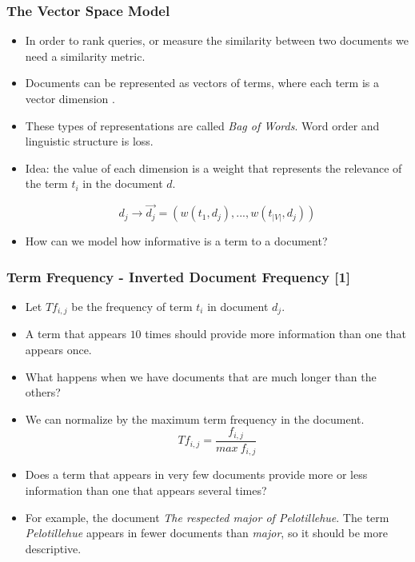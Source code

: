 \documentclass[handout]{beamer}
\begin{document}
\begin{frame}\frametitle{The Vector Space Model}
\footnotesize{
\begin{itemize}
 \item In order to rank queries, or measure the similarity between two documents we need a similarity metric.
 \item Documents can be represented as vectors of terms, where each term is a vector dimension \cite{salton1975vector}. 
 \item These types of representations are called \emph{Bag of Words}. Word order and linguistic structure is loss. 
 \item Idea: the value of each dimension is a weight that represents the relevance of the term $t_{i}$ in the document $d$.

\begin{equation}
 d_{j} \rightarrow \overrightarrow{d_{j}}=(w(t_{1},d_{j}),...,w(t_{|V|},d_{j}))
\end{equation}

\item How can we model how informative is a term to a document?
 
\end{itemize}

}
 
\end{frame}

\begin{frame}\frametitle{Term Frequency - Inverted Document Frequency [1]}
\footnotesize{
\begin{itemize}
 \item Let $Tf_{i,j}$ be the frequency of term $t_{i}$ in document $d_{j}$.
 \item A term that appears $10$ times should provide more information than one that appears once.
 \item  What happens when we have documents that are much longer than the others?
 \item We can normalize by the maximum term frequency in the document. 
\begin{displaymath}
 Tf_{i,j}=\frac{f_{i,j}}{max \ f_{i,j}}
\end{displaymath}
\item  Does a term that appears in very few documents provide more or less information than one that appears several times?
\item For example, the document \emph{The respected major of Pelotillehue}. The term \emph{Pelotillehue} appears in fewer documents than \emph{major}, so it should be more descriptive. 
\end{itemize}


} 
\end{frame}
\end{document}
